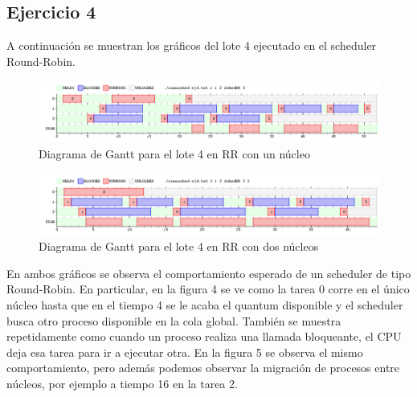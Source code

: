 \subsection{Ejercicio 4}

  A continuaci\'on se muestran los gr\'aficos del lote 4 ejecutado en el scheduler Round-Robin.
  \begin{figure}[htb]
  \includegraphics[scale=0.32]{images/ej4_1.png}
  \caption{Diagrama de Gantt para el lote 4 en RR con un n\'ucleo}
  \end{figure}
  \begin{figure}[htb]
  \includegraphics[scale=0.32]{images/ej4_2.png}
  \caption{Diagrama de Gantt para el lote 4 en RR con dos n\'ucleos}
  \end{figure}

  En ambos gr\'aficos se observa el comportamiento esperado de un scheduler de tipo Round-Robin. En particular, en la figura 4 se ve como la tarea 0 corre en el \'unico n\'ucleo hasta que en el tiempo 4 se le acaba
  el quantum disponible y el scheduler busca otro proceso disponible en la cola global. Tambi\'en se muestra repetidamente como cuando un proceso realiza una llamada bloqueante, el CPU deja esa tarea para ir a ejecutar
  otra. En la figura 5 se observa el mismo comportamiento, pero adem\'as podemos observar la migraci\'on de procesos entre n\'ucleos, por ejemplo a tiempo 16 en la tarea 2.
